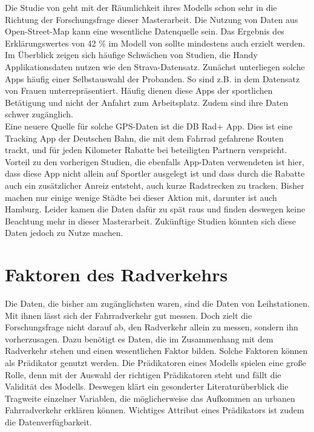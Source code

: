 \documentclass[a4paper,12pt]{thesis}
\begin{document}
Die Studie von \cite{Alattar2021} geht mit der Räumlichkeit ihres Modells schon sehr in die Richtung der Forschungsfrage dieser Masterarbeit. Die Nutzung von Daten aus Open-Street-Map kann eine wesentliche Datenquelle sein. Das Ergebnis des Erklärungswertes von 42 \% im Modell von \cite{Alattar2021} sollte mindestens auch erzielt werden.\\
Im Überblick zeigen sich häufige Schwächen von Studien, die Handy Applikationsdaten nutzen wie den Strava-Datensatz. Zunächst unterliegen solche Apps häufig einer Selbstauswahl der Probanden. So sind z.B. in dem Datensatz von \cite{Alattar2021} Frauen unterrepräsentiert. Häufig dienen diese Apps der sportlichen Betätigung und nicht der Anfahrt zum Arbeitsplatz. Zudem sind ihre Daten schwer zugänglich.\\
Eine neuere Quelle für solche GPS-Daten ist die DB Rad+ App. Dies ist eine Tracking App der Deutschen Bahn, die mit dem Fahrrad gefahrene Routen trackt, und für jeden Kilometer Rabatte bei beteiligten Partnern verspricht. Vorteil zu den vorherigen Studien, die ebenfalls App-Daten verwendeten ist hier, dass diese App nicht allein auf Sportler ausgelegt ist und dass durch die Rabatte auch ein zusätzlicher Anreiz entsteht, auch kurze Radstrecken zu tracken. Bisher machen nur einige wenige Städte bei dieser Aktion mit, darunter ist auch Hamburg. Leider kamen die Daten dafür zu spät raus und finden deswegen keine Beachtung mehr in dieser Masterarbeit. Zukünftige Studien könnten sich diese Daten jedoch zu Nutze machen.


\section{Faktoren des Radverkehrs}

Die Daten, die bisher am zugänglichsten waren, sind die Daten von Leihstationen. Mit ihnen lässt sich der Fahrradverkehr gut messen. Doch zielt die Forschungsfrage nicht darauf ab, den Radverkehr allein zu messen, sondern ihn vorherzusagen. Dazu benötigt es Daten, die im Zusammenhang mit dem Radverkehr stehen und einen wesentlichen Faktor bilden. Solche Faktoren können als Prädikator genutzt werden. Die Prädikatoren eines Modells spielen eine große Rolle, denn mit der Auswahl der richtigen Prädikatoren steht und fällt die Validität des Modells. Deswegen klärt ein gesonderter Literaturüberblick die Tragweite einzelner Variablen, die möglicherweise das Aufkommen an urbanen Fahrradverkehr erklären können. Wichtiges Attribut eines Prädikators ist zudem die Datenverfügbarkeit. 
\end{document}

